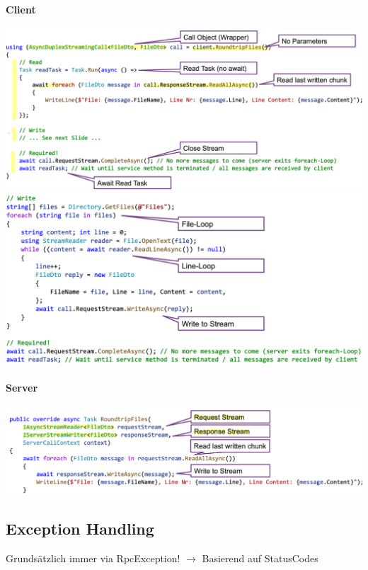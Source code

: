 \paragraph{Client}
\begin{center}
    \includegraphics[scale=.34]{graphic/gprc/Bi-directional client1.png}
    \includegraphics[scale=.34]{graphic/gprc/Bi-directional client2.png}
\end{center}
\vspace{-8pt}
\paragraph{Server}
\begin{center}
    \includegraphics[scale=.34]{graphic/gprc/Bi-directional service.png}
\end{center}
\vspace{-8pt}


\subsection{Exception Handling}
Grundsätzlich immer via RpcException! $\rightarrow$ Basierend auf StatusCodes

